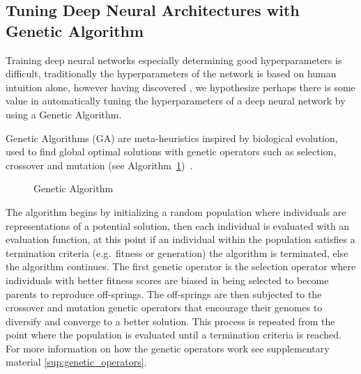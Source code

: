 \newpage
\subsection{Tuning Deep Neural Architectures with Genetic Algorithm}
\label{sec:tuning_deep_nets_with_ga}
Training deep neural networks especially determining good hyperparameters is difficult, traditionally the hyperparameters of the network is based on human intuition alone, however having discovered \cite{kitano1990empirical, leung2003tuning, montana1989training}
, we hypothesize perhaps there is some value in automatically tuning the hyperparameters of a deep neural network by using a Genetic Algorithm.

Genetic Algorithms (GA) are meta-heuristics inspired by biological evolution, used to find global optimal solutions with genetic operators such as selection, crossover and mutation (see Algorithm~\ref{al:ga})~\cite{john1992adaptation, mitchell1998introduction}. 

\begin{figure}
	\vspace{-0.8cm}
	\begin{minipage}[t]{0.48\textwidth}
		\begin{algorithm}[H]
			\caption{Genetic Algorithm}
			\label{al:ga}
			
			\begin{algorithmic}
			    \STATE
				\STATE
					\STATE
					\ENDIF	
					\STATE
				\ENDWHILE
			\end{algorithmic}
		\end{algorithm}
	\end{minipage}
	\vspace{-0.4cm}
\end{figure}

The algorithm begins by initializing a random population where individuals are representations of a potential solution, then each individual is evaluated with an evaluation function, at this point if an individual within the population satisfies a termination criteria (e.g.\ fitness or generation) the algorithm is terminated, else the algorithm continues. The first genetic operator is the selection operator where individuals with better fitness scores are biased in being selected to become parents to reproduce off-springs. The off-springs are then subjected to the crossover and mutation genetic operators that encourage their genomes to diversify and converge to a better solution. This process is repeated from the point where the population is evaluated until a termination criteria is reached. For more information on how the genetic operators work see supplementary material \ref{sup:genetic_operators}.



